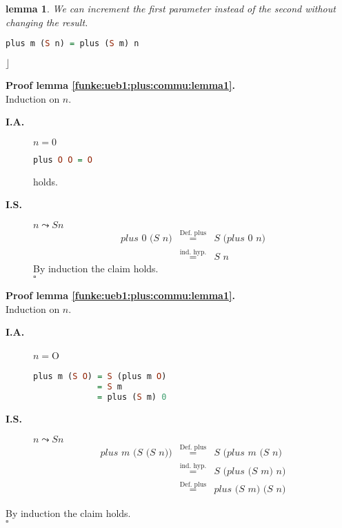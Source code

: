 \documentclass[11pt,a4paper,ngerman]{article}
\newtheorem{lemma}{\bfseries lemma}
\begin{document}
\begin{lemma} \label{funke:ueb1:plus:commu:lemma2}
We can increment the first parameter instead of the second without changing the result.
\begin{lstlisting}[language=haskell]
plus m (S n) = plus (S m) n
\end{lstlisting}
\mbox{}\hfill$\rfloor$\\
\end{lemma}

\textbf{Proof lemma \ref{funke:ueb1:plus:commu:lemma1}.}\\
Induction on $n$.\\
\begin{description}
   \item[\bfseries I.A.] $n=0$\\
\begin{lstlisting}[language=haskell]
plus O O = O
\end{lstlisting}
holds.
   \item[\bfseries I.S.] $n \leadsto S n$\\
$$\begin{array}{rcl}
\textit{plus 0 (S n)} &\stackrel{\text{Def. plus}}{=}&
      \textit{S (plus 0 n)}\\
   &\stackrel{\text{ind. hyp.}}{=}&
      \textit{S n}
\end{array}$$
By induction the claim holds.\\
\mbox{}\hfill$\square$
\end{description}

\textbf{Proof lemma \ref{funke:ueb1:plus:commu:lemma1}.}\\
Induction on $n$.\\
\begin{description}
   \item[\bfseries I.A.] $n = $O\\
\begin{lstlisting}[language=haskell]
plus m (S O) = S (plus m O)
             = S m
             = plus (S m) 0
\end{lstlisting}
   \item[\bfseries I.S.] $n \leadsto S n$\\
$$\begin{array}{rcl}
\textit{plus m (S (S n))} &\stackrel{\text{Def. plus}}{=}&
      \textit{S (plus m (S n)}\\
   &\stackrel{\text{ind. hyp.}}{=}&
      \textit{S (plus (S m) n)}\\
   &\stackrel{\text{Def. plus}}{=}&
      \textit{plus (S m) (S n)}
\end{array}$$
\end{description}
By induction the claim holds.\\
\mbox{}\hfill$\square$
\end{document}

